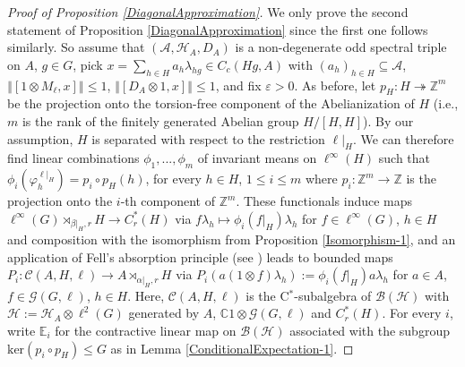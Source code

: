 \documentclass[a4paper,11pt,reqno]{amsart}
\numberwithin{equation}{section}
\numberwithin{equation}{section}
\theoremstyle{definition}
\theoremstyle{remark}
\theoremstyle{remark}
\begin{document}
\begin{proof}[{Proof of Proposition \ref{DiagonalApproximation}}]
We only prove the second statement of Proposition \ref{DiagonalApproximation}
since the first one follows similarly. So assume that $(\mathcal{A},\mathcal{H}_{A},D_{A})$
is a non-degenerate odd spectral triple on $A$, $g\in G$, pick $x=\sum_{h\in H}a_{h}\lambda_{hg}\in C_{c}(Hg,A)$
with $(a_{h})_{h\in H}\subseteq\mathcal{A}$, $\left\Vert [1\otimes M_{\ell},x]\right\Vert \leq1$,
$\left\Vert [D_{A}\otimes1,x]\right\Vert \leq1$, and fix $\varepsilon>0$.
As before, let $p_{H}:H\twoheadrightarrow\mathbb{Z}^{m}$ be the projection
onto the torsion-free component of the Abelianization of $H$ (i.e.,
$m$ is the rank of the finitely generated Abelian group $H/[H,H]$).
By our assumption, $H$ is separated with respect to the restriction
$\ell|_{H}$. We can therefore find linear combinations $\phi_{1},...,\phi_{m}$
of invariant means on $\ell^{\infty}(H)$ such that $\phi_{i}(\varphi_{h}^{\ell|_{H}})=p_{i}\circ p_{H}(h)$,
for every $h\in H$, $1\leq i\leq m$ where $p_{i}:\mathbb{Z}^{m}\rightarrow\mathbb{Z}$
is the projection onto the $i$-th component of $\mathbb{Z}^{m}$.
These functionals induce maps $\ell^{\infty}(G)\rtimes_{\beta|_{H},r}H\rightarrow C_{r}^{\ast}(H)$
via $f\lambda_{h}\mapsto\phi_{i}(f|_{H})\lambda_{h}$ for $f\in\ell^{\infty}(G)$,
$h\in H$ and composition with the isomorphism from Proposition \ref{Isomorphism-1},
and an application of Fell's absorption principle (see \cite[Proposition 4.1.7]{BrownOzawa})
leads to bounded maps $P_{i}:\mathcal{C}(A,H,\ell)\rightarrow A\rtimes_{\alpha|_H,r}H$
via $P_{i}(a(1\otimes f)\lambda_{h}):=\phi_{i}(f|_{H})a\lambda_{h}$
for $a\in A$, $f\in\mathcal{G}(G,\ell)$, $h\in H$. Here, $\mathcal{C}(A,H,\ell)$
is the C$^{\ast}$-subalgebra of $\mathcal{B}(\mathcal{H})$ with
$\mathcal{H}:=\mathcal{H}_{A}\otimes\ell^{2}(G)$ generated by $A$,
$\mathbb{C}1\otimes\mathcal{G}(G,\ell)$ and $C_{r}^{\ast}(H)$. For every $i$, write $\mathbb{E}_{i}$ for
the contractive linear map on $\mathcal{B}(\mathcal{H})$ associated with the subgroup $\text{ker}(p_i \circ p_H) \leq G$ as in Lemma \ref{ConditionalExpectation-1}.


\end{proof}
\end{document}
